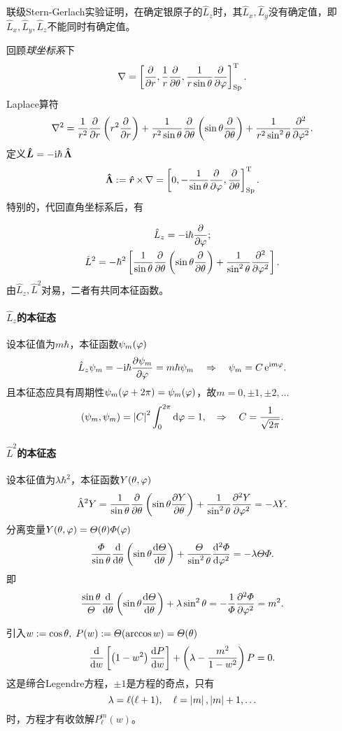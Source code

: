 联级Stern-Gerlach实验证明，在确定银原子的$\hat L_z$时，其$\hat L_x,\hat L_y$没有确定值，即$\hat L_x,\hat L_y,\hat L_z$不能同时有确定值。

回顾\textit{球坐标系}下
\[
	\nabla=\fkh{\pp r,\frac1r\pp\ct,\frac1{r\sin\ct}\pp\vf}\tp_\mathrm{Sp}.
\]
Laplace算符
\[
	\nabla^2=\frac1{r^2}\pp r\kh{r^2\pp r}+\frac1{r^2\sin\theta}\pp\theta\kh{\sin\theta\pp\theta}+\frac1{r^2\sin^2\theta}\pp[2]\vf.
\]
定义$\bm{\hat L}\!\mathop{}=-\mathrm{i}\hbar\,\bm{\hat \Lambda}\!\mathop{}$
\[
	\qo\Lambda:=\qo r\times\,\nabla=\fkh{0,-\frac1{\sin\theta}\pp\vf,\pp\theta}\tp_\mathrm{Sp}.
\]
特别的，代回直角坐标系后，有
\iffalse
	\begin{align*}
		\hat L_x & =\i\hbar\kh{+\sin\vf\pp\ct+\cot\ct\cos\vf\pp\vf} \\
		\hat L_y & =\i\hbar\kh{-\cos\vf\pp\ct+\cot\ct\sin\vf\pp\vf} \\
		\hat L_z & =-\i\hbar\pp\vf.
	\end{align*}
\fi
\begin{gather}
	\hat L_z=-\i\hbar\pp\vf;\\
	\hat L^2=-\hbar^2\fkh{\frac1{\sin\theta}\pp\theta\kh{\sin\theta\pp\theta}+\frac1{\sin^2\ct}\pp[2]\vf}.
\end{gather}
由$\hat L_z,\hat L^2$对易，二者有共同本征函数。
\paragraph*{$\hat L_z$的本征态}设本征值为$m\hbar$，本征函数$\psi_m(\varphi)$
\[
	\hat L_z\psi_m=-\mathrm{i}\hbar\frac{\partial^{\;\!\!}\psi_m}{\partial \varphi^{\;\!\!}}=m\hbar\psi_m\quad\Rightarrow\quad\psi_m=C\mathop{}\!\mathrm{e}^{\mathrm{i} m\varphi}.
\]
且本征态应具有周期性$\psi_m(\varphi+2\pi)=\psi_m(\varphi)$，故$m=0,\pm 1,\pm 2,\ldots$
\[
	(\psi_m,\psi_m)=\left\lvert C\right\rvert^2\int_0^{2\pi}\mathop{}\!\mathrm{d}\varphi=1,\quad\Rightarrow\quad C=\frac1{\sqrt{2\pi}}.
\]
\paragraph*{$\hat L^2$的本征态}设本征值为$\lambda\hbar^2$，本征函数$Y(\theta,\varphi)$
\[
	\hat\Lambda^2Y=\frac1{\sin\theta}\pp\theta\kh{\sin\theta\pv Y\theta}+\frac1{\sin^2\ct}\pv[2]Y\vf=-\lambda Y.
\]
分离变量$Y(\theta,\varphi)=\varTheta(\theta)\varPhi(\varphi)$
\[
	\frac\vF{\sin\ct}\dd\ct\kh{\sin\ct\dv\vC\ct}+\frac\vC{\sin^2\ct}\dv[2]\vF\vf=-\lambda\vC\vF.
\]
即
\[
	\frac{\sin\theta}\vC\dd\ct\kh{\sin\theta\dv\vC\ct}+\lambda\sin^2\ct=-\frac1\vF\pv[2]\vF\vf=m^2.
\]

引入$w:=\cos\theta,\;P(w):=\varTheta(\arccos w)=\varTheta(\theta)$
\begin{equation}
	\dd w\fkh{\kh{1-w^2}\dv Pw}+\kh{\lambda-\frac{m^2}{1-w^2}}P=0.
\end{equation}
这是缔合Legendre方程，$\pm 1$是方程的奇点，只有
\[
	\lambda=\ell(\ell+1),\quad\ell=\left\lvert m\right\rvert,\left\lvert m\right\rvert+1,\ldots
\]
时，方程才有收敛解$P_\ell^m(w)$。

